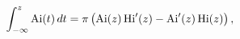 \[\int_{-\infty}^{z}\mathop{\mathrm{Ai}\/}\nolimits\!\left(t\right)dt=\pi\left(%
\mathop{\mathrm{Ai}\/}\nolimits\!\left(z\right)\mathop{\mathrm{Hi}\/}\nolimits%
'\!\left(z\right)-\mathop{\mathrm{Ai}\/}\nolimits'\!\left(z\right)\mathop{%
\mathrm{Hi}\/}\nolimits\!\left(z\right)\right),\]